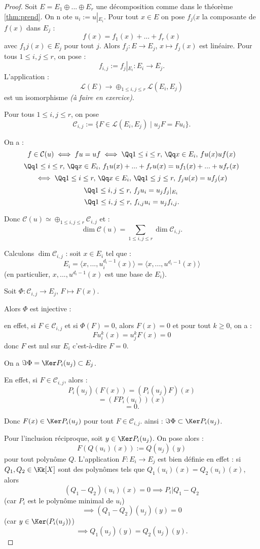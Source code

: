 \documentclass[class=report,crop=false]{standalone}
\newcommand{\iso}{\simeq}
\newcommand{\exoo}{\emph{(à faire en exercice)}}
\newcommand{\Res}[1]{{\left | {}_{#1} \right.}}
\begin{document}
\begin{proof}
Soit $E =E_1 \oplus ... \oplus E_r$ une décomposition comme dans le théorème \ref{thm:prend}. On n ote $u_i:=u\Res{E_i}$. Pour tout $x \in E$ on pose $f_j(x$ la composante de $f(x) $ dans $E_j$ :
\[f(x) = f_1(x) +... +f_r(x)\]
avec $f_1 j(x) \in E_j$ pour tout $j$. Alors $f_j : E \to E_j$, $x \mapsto f_j(x)$ est linéaire. Pour tous  $1 \le i,j \le r$, on pose :
\[f_{i,j}:=f_j\Res{E_i} : E_i \to E_j .\]
L'application :
\[\mathcal{L}(E) \to \oplus_{1 \le i,j \le r}\mathcal{L}(E_i,E_j)\]
est un isomorphisme \exoo .

Pour tous $1 \le i,j \le r$, on pose 
\[\mathcal{C}_{i,j}:= \{F \in \mathcal{L}(E_i,E_j) \mid u_jF=Fu_i\}.\]

On a :
\[f \in \mathcal{C}(u) \iff fu=uf \iff \Qq 1 \le i\le r,\, \Qq x \in E_i,\, fu(x) uf(x)\]
\[ \Qq 1 \le i\le r,\, \Qq x \in E_i,\, f_1u(x)+...+f_ru(x) = uf_1(x)+...+uf_r(x)\]
\[\iff \Qq 1 \le i\le r,\, \Qq x \in E_i,\, \Qq 1 \le j\le r,\, f_ju(x) =uf_j(x)\]
\[\Qq 1 \le i,j \le r,\, f_ju_i = u_jf_j\Res{E_i}\]
\[\Qq 1 \le i,j \le r,\, f_{i,j}u_i = u_j f_{i,j}.\]

Donc $\mathcal{C}(u) \iso \oplus_{1 \le i,j\le r}\mathcal{C}_{i,j}$ et :
\[\dim \mathcal{C}(u)= \sum_{1 \le i,j \le r}\dim  \mathcal{C}_{i,j}.\]

Calculons $\dim\mathcal{C}_{i,j}$ : soit $x \in E_i$ tel que :
\[E_i = \langle x,...,u_i^{d_i-1}(x)\rangle = \langle x,...,u^{d_i-1}(x)\rangle \]
(en particulier, $x,...,u^{d_i-1}(x)$ est une base de $E_i$).

Soit $\Phi : \mathcal{C}_{i,j} \to E_j$, $F \mapsto F(x)$.

Alors $\Phi$ est injective :

en effet, si $F\in \mathcal{C}_{i,j}$ et si $\Phi(F) = 0$, alors $F(x)=0$ et pour tout $k \ge 0$, on a :
\[Fu_i^k(x) = u_j^kF(x) = 0\]
donc $F$ est nul sur $E_i$ c'est-à-dire $F =0$.

On a $\Im \Phi = \Ker P_i(u_j) \subset E_j$.

En effet, si $F \in \mathcal{C}_{i,j}$, alors  :
\[P_i(u_j)(F(x)) = (P_i(u_j) F) (x) \]
\[= (FP_i(u_i))(x)\] 
\[= 0.\]

Donc $F(x) \in \Ker P_i(u_j)$ pour tout $F\in \mathcal{C}_{i,j}$. ainsi : $\Im \Phi \subset \Ker P_i(u_j)$.  

Pour l'inclusion réciproque, soit $y \in \Ker P_i(u_j)$. On pose alors :
\[F(Q(u_i)(x)) := Q(u_j)(y)   \]
pour tout polynôme $Q$.
L'application $F: E_i \to E_j$ est bien définie en effet :
si $Q_1,Q_2 \in \Kk[X]$ sont des polynômes tels que $Q_1(u_i)(x) =Q_2(u_i)(x)$, alors \[(Q_1-Q_2)(u_i)(x) =0 \implies P_i | Q_1-Q_2\]
(car $P_i$ est le polynôme minimal de $u_i$)
\[\implies (Q_1-Q_2)(u_j)(y)=0\]
(car $y \in \Ker (P_i(u_j))$)
\[\implies Q_1(u_j)(y) =Q_2(u_j)(y).\]


\end{proof}
\end{document}
